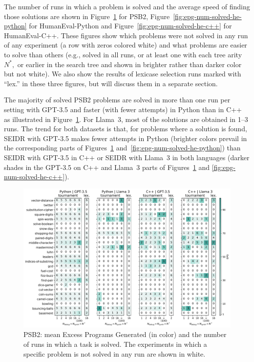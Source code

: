 The number of runs in which a problem is solved and the average speed of finding those solutions are shown in Figure~\ref{fig:epg-num-solved-psb2} for PSB2, Figure~\ref{fig:epg-num-solved-he-python}
for HumanEval-Python and Figure~\ref{fig:epg-num-solved-he-c++} for HumanEval-C++.
These figures show which problems were not solved in any run of any experiment (a row with zeros colored white) and what problems are easier to solve than others (e.g., solved in all runs, or at least one with each tree arity $N^*,$ or earlier in the search tree and shown in brighter rather than darker color but not white). 
We also show the results of lexicase selection runs marked with ``lex.'' in these three figures, but will discuss them in a separate section. 

The majority of solved PSB2 problems are solved in more than one run per setting with GPT-3.5 and faster (with fewer attempts) in Python than in C++ as illustrated in Figure~\ref{fig:epg-num-solved-psb2}.
For Llama~3, most of the solutions are obtained in 1--3 runs.
The trend for both datasets is that, for problems where a solution is found, SEIDR with GPT-3.5 makes fewer attempts in Python (brighter colors prevail in the corresponding parts of Figures~\ref{fig:epg-num-solved-psb2} and~\ref{fig:epg-num-solved-he-python}) than SEIDR with GPT-3.5 in C++ or SEIDR with Llama~3 in both languages (darker shades in the GPT-3.5 on C++ and Llama~3 parts of Figures~\ref{fig:epg-num-solved-psb2} and \ref{fig:epg-num-solved-he-c++}).


\begin{figure}
  \centering
  \includegraphics[width=\linewidth, trim={3mm 2.8mm 3mm 2mm}, clip]{images/epg_mean_and_num_runs_problem_solved_avg_score_check_w_lexicase_psb2_6runs_heatmap_v5.pdf}
  \caption{PSB2: mean Excess Programs Generated (in color) and the number of runs in which a task is solved. The experiments in which a specific problem is not solved in any run are shown in white.}
  \label{fig:epg-num-solved-psb2}
\end{figure}

